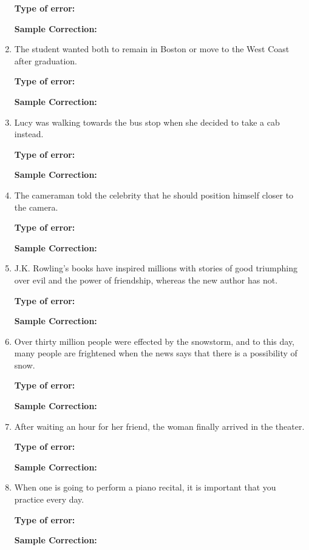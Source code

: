\documentclass[12pt]{book}
\begin{document}
\begin{enumerate}
\bigskip
\textbf{Type of error:} \hrulefill

\textbf{Sample Correction:} \hrulefill

\item The student wanted both to remain in Boston or move to the West Coast after graduation.

\bigskip
\textbf{Type of error:} \hrulefill

\textbf{Sample Correction:} \hrulefill

\item Lucy was walking towards the bus stop when she decided to take a cab instead.

\bigskip
\textbf{Type of error:} \hrulefill

\textbf{Sample Correction:} \hrulefill 

\item The cameraman told the celebrity that he should position himself closer to the camera. 

\bigskip
\textbf{Type of error:} \hrulefill

\textbf{Sample Correction:} \hrulefill 

\item J.K. Rowling’s books have inspired millions with stories of good triumphing over evil and the power of friendship, whereas the new author has not. 

\bigskip
\textbf{Type of error:} \hrulefill

\textbf{Sample Correction:} \hrulefill 

\item Over thirty million people were effected by the snowstorm, and to this day, many people are frightened when the news says that there is a possibility of snow. 

\bigskip
\textbf{Type of error:} \hrulefill

\textbf{Sample Correction:} \hrulefill 

\item After waiting an hour for her friend, the woman finally arrived in the theater.

\bigskip
\textbf{Type of error:} \hrulefill

\textbf{Sample Correction:} \hrulefill 

\item When one is going to perform a piano recital, it is important that you practice every day. 

\bigskip
\textbf{Type of error:} \hrulefill

\textbf{Sample Correction:} \hrulefill 


\end{enumerate}
\end{document}
